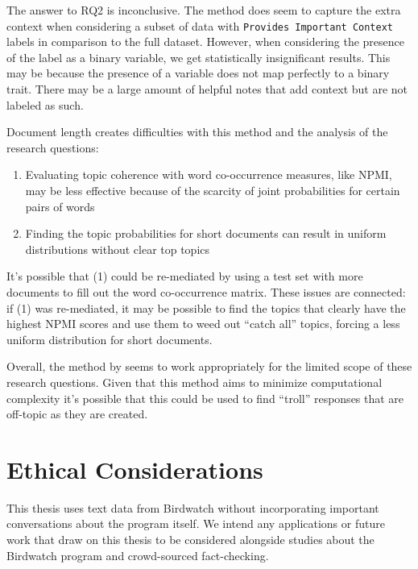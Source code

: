 \documentclass [11pt, proquest] {uwthesis}[2020/02/24]
\begin{document}
The answer to RQ2 is inconclusive. The method does seem to capture the extra context when considering a subset of data with \verb|Provides Important Context| labels in comparison to the full dataset.
However, when considering the presence of the label as a binary variable, we get statistically insignificant results. This may be because the presence of a variable does not map perfectly to a binary trait. There may be a large amount of helpful notes that add context but are not labeled as such.

Document length creates difficulties with this method and the analysis of the research questions:

\begin{enumerate}
    \item Evaluating topic coherence with word co-occurrence measures, like NPMI, may be less effective because of the scarcity of joint probabilities for certain pairs of words
    \item Finding the topic probabilities for short documents can result in uniform distributions without clear top topics
\end{enumerate}

It’s possible that (1) could be re-mediated by using a test set with more documents to fill out the word co-occurrence matrix. These issues are connected: if (1) was re-mediated, it may be possible to find the topics that clearly have the highest NPMI scores and use them to weed out “catch all” topics, forcing a less uniform distribution for short documents.

Overall, the method by \cite{sia-etal-2020-tired} seems to work appropriately for the limited scope of these research questions. Given that this method aims to minimize computational complexity it’s possible that this could be used to find “troll” responses that are off-topic as they are created.

\chapter{Ethical Considerations}\label{ethicalconsiderations}

This thesis uses text data from Birdwatch without incorporating important conversations about the program itself. We intend any applications or future work that draw on this thesis to be considered alongside studies about the Birdwatch program and crowd-sourced fact-checking.
\end{document}
